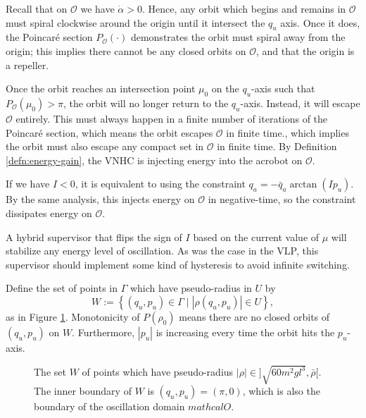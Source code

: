 Recall that on \(\mathcal{O}\) we have \(\dot{\alpha} > 0\). 
Hence, any orbit which begins and remains in \(\mathcal{O}\)
must spiral clockwise around the origin until it intersect the \(q_u\) axis.
Once it does, the Poincar\'{e} section \(P_\mathcal{O}(\cdot)\) 
demonstrates the orbit must spiral away from the origin; 
this implies there cannot be any closed orbits on \(\mathcal{O}\), and that the
origin is a repeller.

Once the orbit reaches an intersection point \(\mu_0\) on the \(q_u\)-axis such
that \(P_\mathcal{O}(\mu_0) > \pi\), the orbit will no longer return to the
\(q_u\)-axis. 
Instead, it will escape \(\mathcal{O}\) entirely.
This must always happen in a finite number of iterations of the 
Poincar\'{e} section, which means the orbit escapes \(\mathcal{O}\) in finite
time., which implies the orbit must also escape
any compact set in \(\mathcal{O}\) in finite time. 
By Definition \ref{defn:energy-gain}, the VNHC is injecting energy into the
acrobot on \(\mathcal{O}\).

If we have \(I < 0\), it is equivalent to using the constraint 
\(q_a = -\bar{q}_a \arctan(I p_u)\). 
By the same analysis, this injects energy on \(\mathcal{O}\) in negative-time, so the
constraint dissipates energy on \(\mathcal{O}\).

A hybrid supervisor that flips the sign of \(I\) based on the current
value of \(\mu\) will stabilize any energy level of oscillation.
As was the case in the VLP, this supervisor should implement some kind of
hysteresis to avoid infinite switching.


Define the set of points in \(\Gamma\) which have pseudo-radius in \(U\) by
\[
    W := \left\{(q_u,p_u) \in \Gamma \mid |\rho(q_u,p_u)| \in U \right\}
    ,
\]
as in Figure \ref{fig:acrobot-rot-W}.
Monotonicity of \(P(\rho_0)\) means there are no closed orbits of 
\((q_u,p_u)\) on \(W\). 
Furthermore, \(|p_u|\) is increasing every time the orbit hits the
\(p_u\)-axis. 

\begin{figure}
    \centering
    \caption{The set \(W\) of points which have pseudo-radius 
        \(|\rho| \in ]\sqrt{60m^2gl^3}, \bar{\rho}[\). The inner boundary of \(W\)
        is \((q_u,p_u) = (\pi,0)\), which is also the boundary of the
        oscillation domain \(mathcal{O}\).}
    \label{fig:acrobot-rot-W}
\end{figure}

